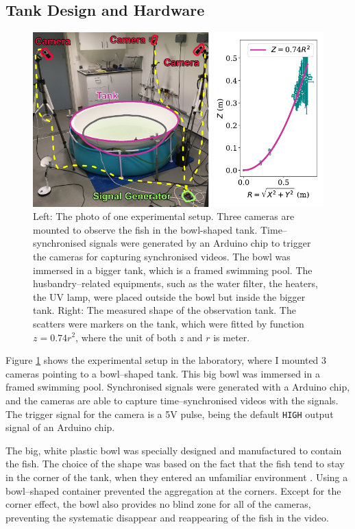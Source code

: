 \documentclass[11pt,twoside]{report}
\begin{document}
\subsection{Tank Design and Hardware}
\label{section:system_3d}

\begin{figure}
  \includegraphics[width=\linewidth]{lab}
  \caption[Three dimensional fish tracking system]{
  Left: The photo of one experimental setup. Three cameras are mounted to observe the fish in the bowl-shaped tank. Time--synchronised signals were generated by an Arduino chip to trigger the cameras for capturing synchronised videos. The bowl was immersed in a bigger tank, which is a framed swimming pool. The husbandry--related equipments, such as the water filter, the heaters, the UV lamp, were placed outside the bowl but inside the bigger tank.
  Right: The measured shape of the observation tank. The scatters were markers on the tank, which were fitted by function $z=0.74 r^2$, where the unit of both $z$ and $r$ is meter.
  }
  \label{fig:lab}
\end{figure}

Figure \ref{fig:lab} shows the experimental setup in the laboratory, where I mounted 3 cameras pointing to a bowl--shaped tank. This big bowl was immersed in a framed swimming pool. Synchronised signals were generated with a Arduino chip, and the cameras are able to capture time--synchronised videos with the signals. The trigger signal for the camera is a 5V pulse, being the default \texttt{HIGH} output signal of an Arduino chip.


The big, white plastic bowl was specially designed and manufactured to contain the fish. The choice of the shape was based on the fact that the fish tend to stay in the corner of the tank, when they entered an unfamiliar environment \cite{kalueff2013, mwaffo2016}. Using a bowl--shaped container prevented the aggregation at the corners. Except for the corner effect, the bowl also provides no blind zone for all of the cameras, preventing the systematic disappear and reappearing of the fish in the video.
\end{document}
